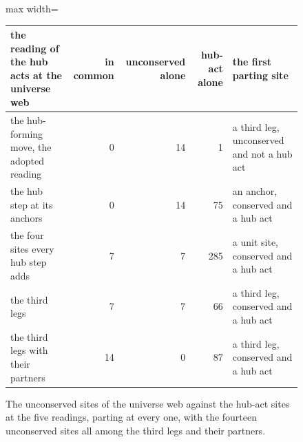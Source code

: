 \begin{figure}[h]\centering
\begin{adjustbox}{max width=\linewidth}\begin{tabular}{lrrrl}\toprule
the reading of the hub acts at the universe web & in common & unconserved alone & hub-act alone & the first parting site \\ \midrule
the hub-forming move, the adopted reading & 0 & 14 & 1 & a third leg, unconserved and not a hub act \\
the hub step at its anchors & 0 & 14 & 75 & an anchor, conserved and a hub act \\
the four sites every hub step adds & 7 & 7 & 285 & a unit site, conserved and a hub act \\
the third legs & 7 & 7 & 66 & a third leg, conserved and a hub act \\
the third legs with their partners & 14 & 0 & 87 & a third leg, conserved and a hub act \\ \bottomrule
\end{tabular}\end{adjustbox}
\caption{The unconserved sites of the universe web against the hub-act sites at the five readings, parting at every one, with the fourteen unconserved sites all among the third legs and their partners.}
\end{figure}
